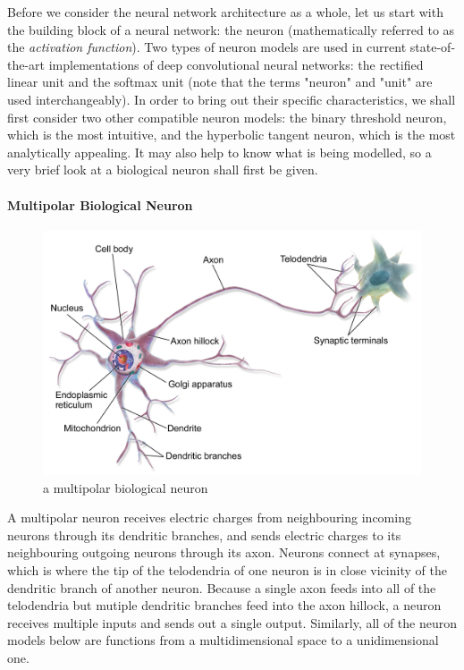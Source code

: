 \documentclass[a4paper,11pt]{article}
\begin{document}
Before we consider the neural network architecture as a whole, let us start with the building block of a neural network: the neuron (mathematically referred to as the \textit{activation function}). Two types of neuron models are used in current state-of-the-art implementations of deep convolutional neural networks: the rectified linear unit and the softmax unit (note that the terms "neuron" and "unit" are used interchangeably). In order to bring out their specific characteristics, we shall first consider two other compatible neuron models: the binary threshold neuron, which is the most intuitive, and the hyperbolic tangent neuron, which is the most analytically appealing. It may also help to know what is being modelled, so a very brief look at a biological neuron shall first be given.

\paragraph{Multipolar Biological Neuron}

\begin{figure}[h!]
	\centering
	\includegraphics[scale=0.3]{images/Biological_Neuron.png}
	\caption{a multipolar biological neuron}
\end{figure}

A multipolar neuron receives electric charges from neighbouring incoming neurons through its dendritic branches, and sends electric charges to its neighbouring outgoing neurons through its axon. Neurons connect at synapses, which is where the tip of the telodendria of one neuron is in close vicinity of the dendritic branch of another neuron. Because a single axon feeds into all of the telodendria but mutiple dendritic branches feed into the axon hillock, a neuron receives multiple inputs and sends out a single output. Similarly, all of the neuron models below are functions from a multidimensional space to a unidimensional one.\\
\end{document}
